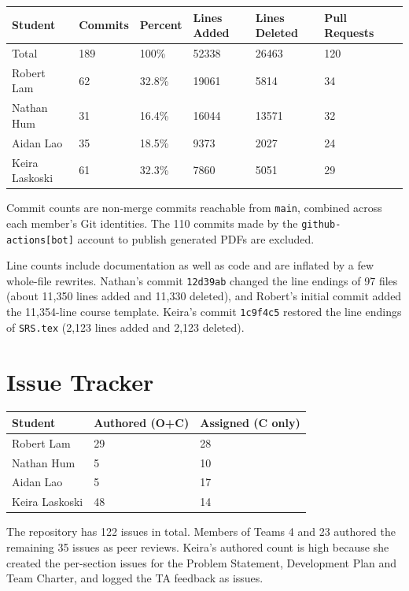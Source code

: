 \documentclass{article}
\begin{document}
\begin{table}[H]
\centering
\begin{tabular}{lllllll}
\toprule
\textbf{Student} & \textbf{Commits} & \textbf{Percent} & \textbf{Lines Added} &
\textbf{Lines Deleted} & \textbf{Pull Requests}\\
\midrule
Total & 189 & 100\% & 52338 & 26463 & 120\\
Robert Lam & 62 & 32.8\% & 19061 & 5814 & 34\\
Nathan Hum & 31 & 16.4\% & 16044 & 13571 & 32\\
Aidan Lao & 35 & 18.5\% & 9373 & 2027 & 24\\
Keira Laskoski & 61 & 32.3\% & 7860 & 5051 & 29\\
\bottomrule
\end{tabular}
\end{table}

Commit counts are non-merge commits reachable from \texttt{main}, combined
across each member's Git identities. The 110 commits made by the
\texttt{github-actions[bot]} account to publish generated PDFs are excluded.

Line counts include documentation as well as code and are inflated by a few
whole-file rewrites. Nathan's commit \texttt{12d39ab} changed the line endings
of 97 files (about 11{,}350 lines added and 11{,}330 deleted), and Robert's
initial commit added the 11{,}354-line course template. Keira's commit
\texttt{1c9f4c5} restored the line endings of \texttt{SRS.tex} (2{,}123 lines
added and 2{,}123 deleted).

\section{Issue Tracker}

\begin{table}[H]
\centering
\begin{tabular}{lll}
\toprule
\textbf{Student} & \textbf{Authored (O+C)} & \textbf{Assigned (C only)}\\
\midrule
Robert Lam & 29 & 28 \\
Nathan Hum & 5 & 10 \\
Aidan Lao & 5 & 17 \\
Keira Laskoski & 48 & 14 \\
\bottomrule
\end{tabular}
\end{table}

The repository has 122 issues in total. Members of Teams 4 and 23 authored the
remaining 35 issues as peer reviews. Keira's authored count is high because she
created the per-section issues for the Problem Statement, Development Plan and
Team Charter, and logged the TA feedback as issues.
\end{document}
